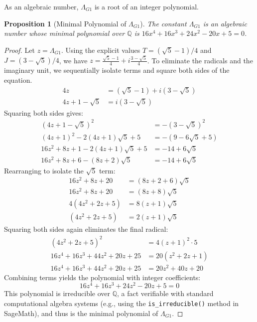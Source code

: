 \documentclass{amsart}
\theoremstyle{plain}
\newtheorem{proposition}[theorem]{Proposition}
\theoremstyle{definition}
\theoremstyle{remark}
\newcommand{\LambdaG}{\Lambda_{G1}}
\begin{document}
As an algebraic number, $\LambdaG$ is a root of an integer polynomial.
\begin{proposition}[Minimal Polynomial of \texorpdfstring{$\LambdaG$}{Lambda\_G1}]
The constant $\LambdaG$ is an algebraic number whose minimal polynomial over $\mathbb{Q}$ is $16x^4 + 16x^3 + 24x^2 - 20x + 5 = 0$.
\end{proposition}
\begin{proof}
Let $z = \LambdaG$. Using the explicit values $T = (\sqrt{5}-1)/4$ and $J = (3-\sqrt{5})/4$, we have $z = \frac{\sqrt{5}-1}{4} + i\frac{3-\sqrt{5}}{4}$. To eliminate the radicals and the imaginary unit, we sequentially isolate terms and square both sides of the equation.
\begin{align*}
    4z &= (\sqrt{5}-1) + i(3-\sqrt{5}) \\
    4z + 1 - \sqrt{5} &= i(3-\sqrt{5})
\end{align*}
Squaring both sides gives:
\begin{align*}
    (4z+1 - \sqrt{5})^2 &= -(3-\sqrt{5})^2 \\
    (4z+1)^2 - 2(4z+1)\sqrt{5} + 5 &= -(9 - 6\sqrt{5} + 5) \\
    16z^2 + 8z + 1 - 2(4z+1)\sqrt{5} + 5 &= -14 + 6\sqrt{5} \\
    16z^2 + 8z + 6 - (8z+2)\sqrt{5} &= -14 + 6\sqrt{5}
\end{align*}
Rearranging to isolate the $\sqrt{5}$ term:
\begin{align*}
    16z^2 + 8z + 20 &= (8z+2+6)\sqrt{5} \\
    16z^2 + 8z + 20 &= (8z+8)\sqrt{5} \\
    4(4z^2 + 2z + 5) &= 8(z+1)\sqrt{5} \\
    (4z^2 + 2z + 5) &= 2(z+1)\sqrt{5}
\end{align*}
Squaring both sides again eliminates the final radical:
\begin{align*}
    (4z^2 + 2z + 5)^2 &= 4(z+1)^2 \cdot 5 \\
    16z^4 + 16z^3 + 44z^2 + 20z + 25 &= 20(z^2 + 2z + 1) \\
    16z^4 + 16z^3 + 44z^2 + 20z + 25 &= 20z^2 + 40z + 20
\end{align*}
Combining terms yields the polynomial with integer coefficients:
\[ 16z^4 + 16z^3 + 24z^2 - 20z + 5 = 0 \]
This polynomial is irreducible over $\mathbb{Q}$, a fact verifiable with standard computational algebra systems (e.g., using the \texttt{is\_irreducible()} method in SageMath), and thus is the minimal polynomial of $\LambdaG$.
\end{proof}
\end{document}
